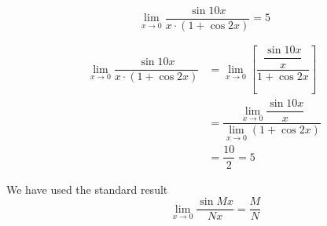 \documentclass[14pt,fleqn]{extarticle}
\begin{document}
 

\[ \lim_{x\to 0}\dfrac{\sin 10 x}{x\cdot (1+\cos 2x)} = 5 \]

\newcard 

\begin{align}
\lim_{x\to 0}\dfrac{\sin 10 x}{x\cdot (1+\cos 2x)} &= \lim_{x\to 0}\left[\dfrac{\dfrac{\sin 10x}{x}}{1+\cos 2x} \right] \\
&= \dfrac{\lim_{x\to 0}\dfrac{\sin 10x}{x}}{\lim_{x\to 0}(1+\cos 2x)} \\
&= \dfrac{10}{2} = 5
\end{align}

We have used the standard result
\[ \qquad \lim_{x\to 0}\dfrac{\sin Mx}{Nx} = \dfrac{M}{N} \]
%
\end{document}
